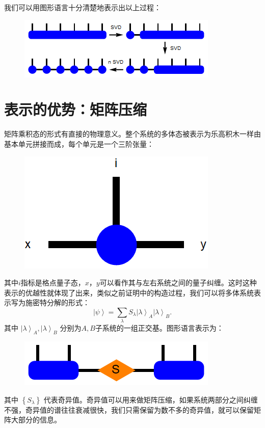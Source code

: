 \documentclass[UTF8]{ctexart}
\begin{document}
我们可以用图形语言十分清楚地表示出以上过程：
\begin{figure}[H]
\begin{centering}
\includegraphics[width=0.6\linewidth]{include/p3}
\par\end{centering}
\end{figure}

\section*{表示的优势：矩阵压缩}
矩阵乘积态的形式有直接的物理意义。整个系统的多体态被表示为乐高积木一样由基本单元拼接而成，每个单元是一个三阶张量：
\begin{figure}[H]
\begin{centering}
\includegraphics[width=0.3\linewidth]{include/p4}
\par\end{centering}
\end{figure}
\noindent 其中$i$指标是格点量子态，$x，y$可以看作其与左右系统之间的量子纠缠。这时这种表示的优越性就体现了出来，类似之前证明中的构造过程，我们可以将多体系统表示写为施密特分解的形式：
\begin{equation}
	\left|\psi\right\rangle =\sum_{\lambda}S_{\lambda}\left|\lambda\right\rangle _{A}\left|\lambda\right\rangle _{B}.
\end{equation}
其中 $\left|\lambda\right\rangle _{A},\left|\lambda\right\rangle _{B}$ 分别为$A,B$子系统的一组正交基。图形语言表示为：
\begin{figure}[H]
\begin{centering}
\includegraphics[width=0.4\linewidth]{include/p5}
\par\end{centering}
\end{figure}
\noindent 其中 $\left\{ S_{\lambda}\right\}$ 代表奇异值。奇异值可以用来做矩阵压缩，如果系统两部分之间纠缠不强，奇异值的谱往往衰减很快，我们只需保留为数不多的奇异值，就可以保留矩阵大部分的信息。
\end{document}
